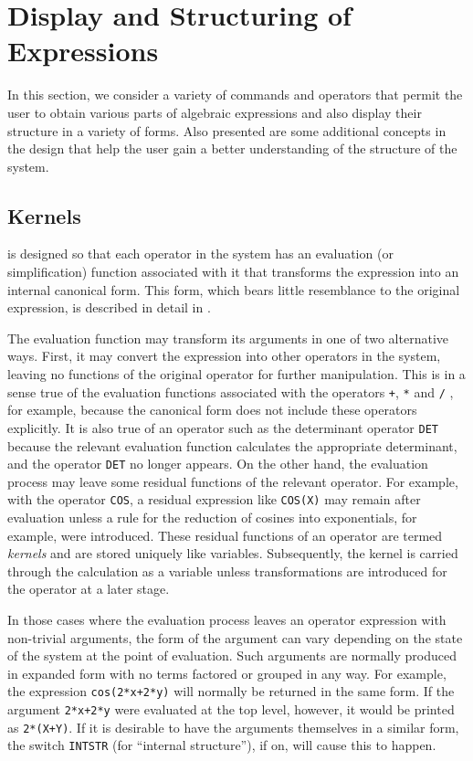 \chapter{Display and Structuring of Expressions}
In this section, we consider a variety of commands and operators that
permit the user to obtain various parts of algebraic expressions and also
display their structure in a variety of forms. Also presented are some
additional concepts in the {\REDUCE} design that help the user gain a better
understanding of the structure of the system.

\section{Kernels}
{\REDUCE} is designed so that each operator in the system has an
evaluation (or simplification) function associated
with it that transforms the expression into an internal canonical form.
  This form, which bears little resemblance to the
original expression, is described in detail in \cite{Hearn:71a}.

The evaluation function may transform its arguments in one of two
alternative ways.  First, it may convert the expression into other
operators in the system, leaving no functions of the original operator for
further manipulation.  This is in a sense true of the evaluation functions
associated with the operators \texttt{+}, \texttt{*} and \texttt{/} , for example,
because the canonical form does not include these
operators explicitly.  It is also true of an operator such as the
determinant operator \texttt{DET} because the relevant
evaluation function calculates the appropriate determinant, and the
operator \texttt{DET} no longer appears.  On the other hand, the evaluation
process may leave some residual functions of the relevant operator.  For
example, with the operator \texttt{COS}, a residual expression like
\texttt{COS(X)} may remain after evaluation unless a rule for the reduction of
cosines into exponentials, for example, were introduced.  These residual
functions of an operator are termed \emph{kernels} and are
stored uniquely like variables.  Subsequently, the kernel is carried
through the calculation as a variable unless transformations are
introduced for the operator at a later stage.

\hypertarget{switch:INTSTR}{}
In those cases where the evaluation process leaves an operator expression
with non-trivial arguments, the form of the argument can vary depending on
the state of the system at the point of evaluation.  Such arguments are
normally produced in expanded form with no terms factored or grouped in
any way.  For example, the expression \texttt{cos(2*x+2*y)} will normally be
returned in the same form.  If the argument \texttt{2*x+2*y} were evaluated
at the top level, however, it would be printed as \texttt{2*(X+Y)}.  If it is
desirable to have the arguments themselves in a similar form, the switch
\texttt{INTSTR} (for ``internal structure''), if on, will
cause this to happen.


